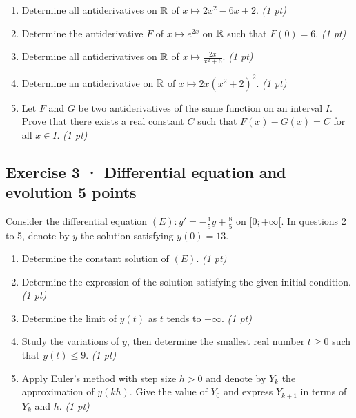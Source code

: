 \begin{enumerate}

\item Determine all antiderivatives on $\mathbb R$ of $x\mapsto 2x^2-6x+2$. \hfill\textit{(1 pt)}

\item Determine the antiderivative $F$ of $x\mapsto e^{2x}$ on $\mathbb R$ such that $F(0)=6$. \hfill\textit{(1 pt)}

\item Determine all antiderivatives on $\mathbb R$ of $x\mapsto\frac{2x}{x^2+6}$. \hfill\textit{(1 pt)}

\item Determine an antiderivative on $\mathbb R$ of $x\mapsto2x(x^2+2)^{2}$. \hfill\textit{(1 pt)}

\item Let $F$ and $G$ be two antiderivatives of the same function on an interval $I$. Prove that there exists a real constant $C$ such that $F(x)-G(x)=C$ for all $x\in I$. \hfill\textit{(1 pt)}

\end{enumerate}

\clearpage{}\par

\subsection*{Exercise 3 · Differential equation and evolution \hfill 5 points}Consider the differential equation $(E):y'=-\frac1{5}y+\frac{8}{5}$ on $[0;+\infty[$. In questions 2 to 5, denote by $y$ the solution satisfying $y(0)=13$.

\begin{enumerate}

\item Determine the constant solution of $(E)$. \hfill\textit{(1 pt)}

\item Determine the expression of the solution satisfying the given initial condition. \hfill\textit{(1 pt)}

\item Determine the limit of $y(t)$ as $t$ tends to $+\infty$. \hfill\textit{(1 pt)}

\item Study the variations of $y$, then determine the smallest real number $t\ge0$ such that $y(t)\le9$. \hfill\textit{(1 pt)}

\item Apply Euler's method with step size $h>0$ and denote by $Y_k$ the approximation of $y(kh)$. Give the value of $Y_0$ and express $Y_{k+1}$ in terms of $Y_k$ and $h$. \hfill\textit{(1 pt)}

\end{enumerate}

